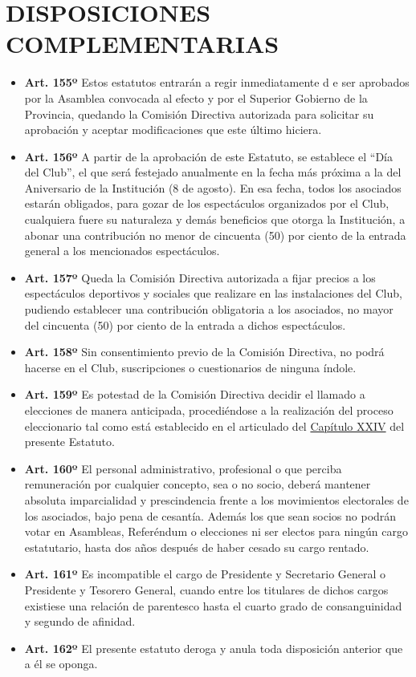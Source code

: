 \documentclass[]{book}
\begin{document}
\chapter{DISPOSICIONES
COMPLEMENTARIAS}\label{disposiciones-complementarias}

\begin{itemize}
\item
  \textbf{Art. 155º} Estos estatutos entrarán a regir inmediatamente d e
  ser aprobados por la Asamblea convocada al efecto y por el Superior
  Gobierno de la Provincia, quedando la Comisión Directiva autorizada
  para solicitar su aprobación y aceptar modificaciones que este último
  hiciera.
\item
  \textbf{Art. 156º} A partir de la aprobación de este Estatuto, se
  establece el ``Día del Club'', el que será festejado anualmente en la
  fecha más próxima a la del Aniversario de la Institución (8 de
  agosto). En esa fecha, todos los asociados estarán obligados, para
  gozar de los espectáculos organizados por el Club, cualquiera fuere su
  naturaleza y demás beneficios que otorga la Institución, a abonar una
  contribución no menor de cincuenta (50) por ciento de la entrada
  general a los mencionados espectáculos.
\item
  \textbf{Art. 157º} Queda la Comisión Directiva autorizada a fijar
  precios a los espectáculos deportivos y sociales que realizare en las
  instalaciones del Club, pudiendo establecer una contribución
  obligatoria a los asociados, no mayor del cincuenta (50) por ciento de
  la entrada a dichos espectáculos.
\item
  \textbf{Art. 158º} Sin consentimiento previo de la Comisión Directiva,
  no podrá hacerse en el Club, suscripciones o cuestionarios de ninguna
  índole.
\item
  \textbf{Art. 159º} Es potestad de la Comisión Directiva decidir el
  llamado a elecciones de manera anticipada, procediéndose a la
  realización del proceso eleccionario tal como está establecido en el
  articulado del \protect\hyperlink{cap24}{Capítulo XXIV} del presente
  Estatuto.
\item
  \textbf{Art. 160º} El personal administrativo, profesional o que
  perciba remuneración por cualquier concepto, sea o no socio, deberá
  mantener absoluta imparcialidad y prescindencia frente a los
  movimientos electorales de los asociados, bajo pena de cesantía.
  Además los que sean socios no podrán votar en Asambleas, Referéndum o
  elecciones ni ser electos para ningún cargo estatutario, hasta dos
  años después de haber cesado su cargo rentado.
\item
  \textbf{Art. 161º} Es incompatible el cargo de Presidente y Secretario
  General o Presidente y Tesorero General, cuando entre los titulares de
  dichos cargos existiese una relación de parentesco hasta el cuarto
  grado de consanguinidad y segundo de afinidad.
\item
  \textbf{Art. 162º} El presente estatuto deroga y anula toda
  disposición anterior que a él se oponga.
\end{itemize}
\end{document}
